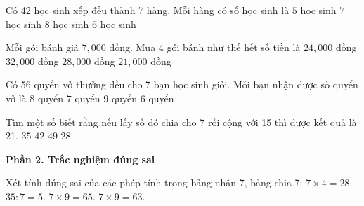\begin{ex} %
Có 42 học sinh xếp đều thành 7 hàng. Mỗi hàng có số học sinh là
\choice
{$5$ học sinh}
{$7$ học sinh}
{$8$ học sinh}
{\True $6$ học sinh}
\end{ex}

\begin{ex} %
Mỗi gói bánh giá $7,000$ đồng. Mua 4 gói bánh như thế hết số tiền là
\choice
{$24,000$ đồng}
{$32,000$ đồng}
{\True $28,000$ đồng}
{$21,000$ đồng}
\end{ex}

\begin{ex} %
Có 56 quyển vở thưởng đều cho 7 bạn học sinh giỏi. Mỗi bạn nhận được số quyển vở là
\choice
{\True $8$ quyển}
{$7$ quyển}
{$9$ quyển}
{$6$ quyển}
\end{ex}

\begin{ex} %
Tìm một số biết rằng nếu lấy số đó chia cho 7 rồi cộng với 15 thì được kết quả là 21.
\choice
{$35$}
{\True $42$}
{$49$}
{$28$}
\end{ex}

\textbf{Phần 2. Trắc nghiệm đúng sai}

\begin{ex} %
Xét tính đúng sai của các phép tính trong bảng nhân 7, bảng chia 7:
\choiceTF
{\True $7 \times 4 = 28$.}
{\True $35 : 7 = 5$.}
{$7 \times 9 = 65$.}
{\True $7 \times 9 = 63$.}
\end{ex}

